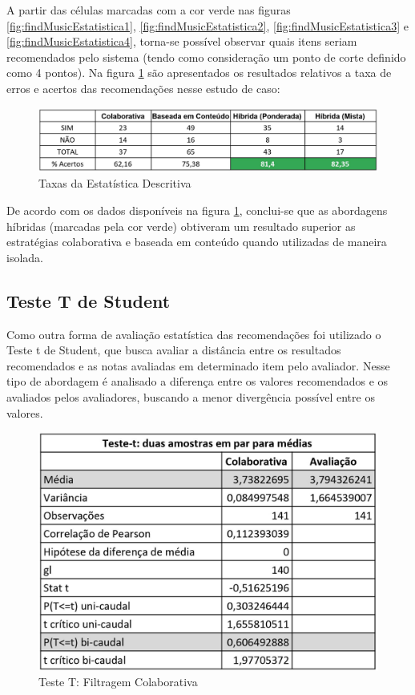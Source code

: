 A partir das células marcadas com a cor verde nas figuras \ref{fig:findMusicEstatistica1}, \ref{fig:findMusicEstatistica2}, \ref{fig:findMusicEstatistica3} e \ref{fig:findMusicEstatistica4}, torna-se possível observar quais itens seriam recomendados pelo sistema (tendo como consideração um ponto de corte definido como 4 pontos). Na figura \ref{fig:findMusicEstatisticaTaxa} são apresentados os resultados relativos a taxa de erros e acertos das recomendações nesse estudo de caso:

\begin{figure}[H]
	\centering
	\includegraphics[width=.9\linewidth]{imagens/findmusicEstatisticaTaxa.jpg}
	\caption[Taxas da Estatística Descritiva]{Taxas da Estatística Descritiva}
    \label{fig:findMusicEstatisticaTaxa}
\end{figure}

De acordo com os dados disponíveis na figura \ref{fig:findMusicEstatisticaTaxa}, conclui-se que as abordagens híbridas (marcadas pela cor verde) obtiveram um resultado superior as estratégias colaborativa e baseada em conteúdo quando utilizadas de maneira isolada.

\subsection{Teste T de Student}

Como outra forma de avaliação estatística das recomendações foi utilizado o Teste t de Student, que busca avaliar a distância entre os resultados recomendados e as notas avaliadas em determinado item pelo avaliador. Nesse tipo de abordagem é analisado a diferença entre os valores recomendados e os avaliados pelos avaliadores, buscando a menor divergência possível entre os valores.

\begin{figure}[H]
	\centering
	\includegraphics[width=.6\linewidth]{imagens/findmusicTesteTColaborativa.jpg}
	\caption[Teste T: Filtragem Colaborativa]{Teste T: Filtragem Colaborativa}
    \label{fig:findMusicTesteTColaborativa}
\end{figure}

